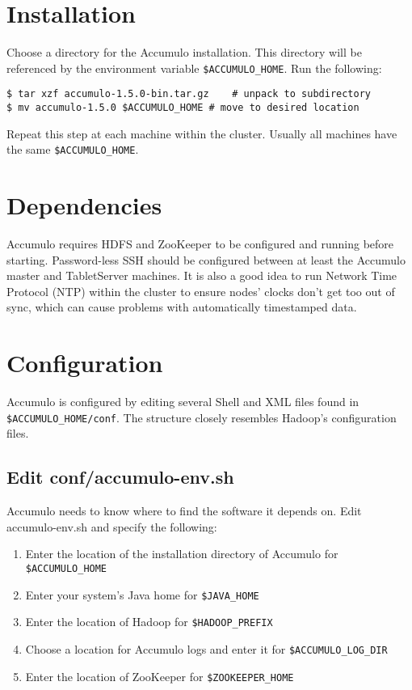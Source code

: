 \section{Installation}
Choose a directory for the Accumulo installation. This directory will be referenced
by the environment variable \texttt{\$ACCUMULO\_HOME}. Run the following:

\begingroup\fontsize{8pt}{8pt}\selectfont\begin{verbatim}
$ tar xzf accumulo-1.5.0-bin.tar.gz    # unpack to subdirectory
$ mv accumulo-1.5.0 $ACCUMULO_HOME # move to desired location
\end{verbatim}\endgroup

Repeat this step at each machine within the cluster. Usually all machines have the
same \texttt{\$ACCUMULO\_HOME}.

\section{Dependencies}
Accumulo requires HDFS and ZooKeeper to be configured and running
before starting. Password-less SSH should be configured between at least the
Accumulo master and TabletServer machines. It is also a good idea to run Network
Time Protocol (NTP) within the cluster to ensure nodes' clocks don't get too out of
sync, which can cause problems with automatically timestamped data. 

\section{Configuration}

Accumulo is configured by editing several Shell and XML files found in
\texttt{\$ACCUMULO\_HOME/conf}. The structure closely resembles Hadoop's configuration
files.

\subsection{Edit conf/accumulo-env.sh}

Accumulo needs to know where to find the software it depends on. Edit accumulo-env.sh 
and specify the following:

\begin{enumerate}
\item{Enter the location of the installation directory of Accumulo for \texttt{\$ACCUMULO\_HOME}}
\item{Enter your system's Java home for \texttt{\$JAVA\_HOME}}
\item{Enter the location of Hadoop for \texttt{\$HADOOP\_PREFIX}}
\item{Choose a location for Accumulo logs and enter it for \texttt{\$ACCUMULO\_LOG\_DIR}}
\item{Enter the location of ZooKeeper for \texttt{\$ZOOKEEPER\_HOME}}
\end{enumerate}

